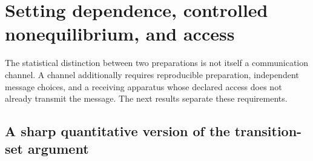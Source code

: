 \documentclass[11pt,a4paper]{article}
\theoremstyle{definition}
\theoremstyle{remark}\newtheorem{remark}[theorem]{Remark}
\begin{document}
\section{Setting dependence, controlled nonequilibrium, and access}
\label{sig:section}

The statistical distinction between two preparations is not itself a
communication channel. A channel additionally requires reproducible
preparation, independent message choices, and a receiving apparatus whose
declared access does not already transmit the message. The next results
separate these requirements.

\subsection{A sharp quantitative version of the transition-set argument}
\end{document}
